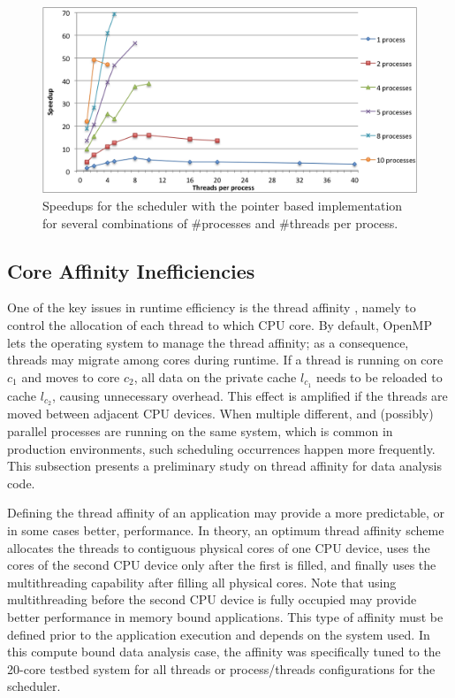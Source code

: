 \begin{figure}[!htp]
	\begin{center}
		\includegraphics[scale=0.5]{charts/speedup_sched.png}
		\caption{Speedups for the scheduler with the pointer based implementation for several combinations of \#processes and \#threads per process.}
		\label{fig:Sched}
	\end{center}
\end{figure}

\subsection{Core Affinity Inefficiencies}

One of the key issues in runtime efficiency is the thread affinity \cite{Affinity}, namely to control the allocation of each thread to which CPU core. By default, OpenMP lets the operating system to manage the thread affinity; as a consequence, threads may migrate among cores during runtime. If a thread is running on core $c_1$ and moves to core $c_2$, all data on the private cache $l_{c_1}$ needs to be reloaded to cache $l_{c_2}$, causing unnecessary overhead. This effect is amplified if the threads are moved between adjacent CPU devices. When multiple different, and (possibly) parallel processes are running on the same system, which is common in production environments, such scheduling occurrences happen more frequently. This subsection presents a preliminary study on thread affinity for data analysis code.

Defining the thread affinity of an application may provide a more predictable, or in some cases better, performance. In theory, an optimum thread affinity scheme allocates the threads to contiguous physical cores of one CPU device, uses the cores of the second CPU device only after the first is filled, and finally uses the multithreading capability after filling all physical cores. Note that using multithreading before the second CPU device is fully occupied may provide better performance in memory bound applications. This type of affinity must be defined prior to the application execution and depends on the system used. In this compute bound data analysis case, the affinity was specifically tuned to the 20-core testbed system for all threads or process/threads configurations for the scheduler.

